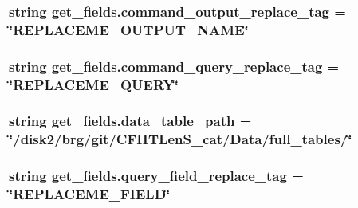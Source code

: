 \hypertarget{namespaceget__fields_a0572e63507c66f3685c2669d693b03a1}{
\subsubsection[{command\-\_\-output\-\_\-replace\-\_\-tag}]{\setlength{\rightskip}{0pt plus 5cm}string get\-\_\-fields.\-command\-\_\-output\-\_\-replace\-\_\-tag = \char`\"{}R\-E\-P\-L\-A\-C\-E\-M\-E\-\_\-\-O\-U\-T\-P\-U\-T\-\_\-\-N\-A\-M\-E\char`\"{}}}\label{namespaceget__fields_a0572e63507c66f3685c2669d693b03a1}
\hypertarget{namespaceget__fields_ad7d8141db83615ef069528508f4a03b5}{
\subsubsection[{command\-\_\-query\-\_\-replace\-\_\-tag}]{\setlength{\rightskip}{0pt plus 5cm}string get\-\_\-fields.\-command\-\_\-query\-\_\-replace\-\_\-tag = \char`\"{}R\-E\-P\-L\-A\-C\-E\-M\-E\-\_\-\-Q\-U\-E\-R\-Y\char`\"{}}}\label{namespaceget__fields_ad7d8141db83615ef069528508f4a03b5}
\hypertarget{namespaceget__fields_a848c48da5f70314c4ee5700eb981a768}{
\subsubsection[{data\-\_\-table\-\_\-path}]{\setlength{\rightskip}{0pt plus 5cm}string get\-\_\-fields.\-data\-\_\-table\-\_\-path = \char`\"{}/disk2/brg/git/C\-F\-H\-T\-Len\-S\-\_\-cat/Data/full\-\_\-tables/\char`\"{}}}\label{namespaceget__fields_a848c48da5f70314c4ee5700eb981a768}
\hypertarget{namespaceget__fields_aaf64ac2680c5eb87d093a9001b30cf6e}{
\subsubsection[{query\-\_\-field\-\_\-replace\-\_\-tag}]{\setlength{\rightskip}{0pt plus 5cm}string get\-\_\-fields.\-query\-\_\-field\-\_\-replace\-\_\-tag = \char`\"{}R\-E\-P\-L\-A\-C\-E\-M\-E\-\_\-\-F\-I\-E\-L\-D\char`\"{}}}\label{namespaceget__fields_aaf64ac2680c5eb87d093a9001b30cf6e}
